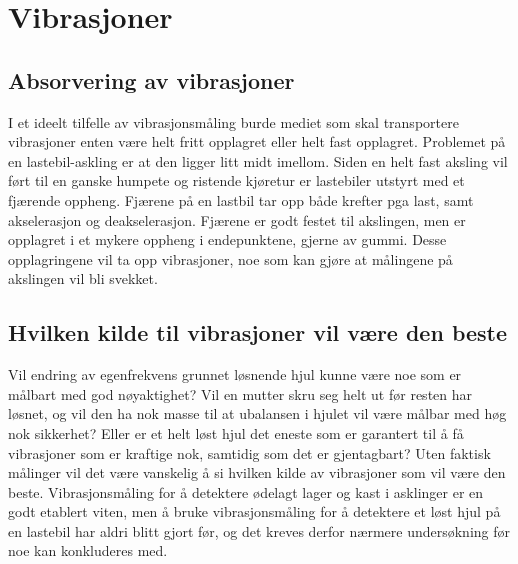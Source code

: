 \section{Vibrasjoner}
\subsection{Absorvering av vibrasjoner}
I et ideelt tilfelle av vibrasjonsmåling burde mediet som skal transportere vibrasjoner 
enten være helt fritt opplagret eller helt fast opplagret. Problemet på en lastebil-askling 
er at den ligger litt midt imellom. Siden en helt fast aksling vil ført til en ganske humpete 
og ristende kjøretur er lastebiler utstyrt med et fjærende oppheng. Fjærene på en lastbil
 tar opp både krefter pga last, samt akselerasjon og deakselerasjon. Fjærene er godt 
festet til akslingen, men er opplagret i et mykere oppheng i endepunktene, gjerne av gummi. 
Desse opplagringene vil ta opp vibrasjoner, noe som kan gjøre at målingene på akslingen vil bli svekket.

\subsection{Hvilken kilde til vibrasjoner vil være den beste}
Vil endring av egenfrekvens grunnet løsnende hjul kunne være noe som er 
målbart med god nøyaktighet? Vil en mutter skru seg helt ut før resten har
 løsnet, og vil den ha nok masse til at ubalansen i hjulet vil være målbar med 
høg nok sikkerhet? Eller er et helt løst hjul det eneste som er garantert til å få 
vibrasjoner som er kraftige nok, samtidig som det er gjentagbart?
Uten faktisk målinger vil det være vanskelig å si hvilken kilde av vibrasjoner 
som vil være den beste. Vibrasjonsmåling for å detektere ødelagt lager og 
kast i asklinger er en godt etablert viten, men å bruke vibrasjonsmåling for 
å detektere et løst hjul på en lastebil har aldri blitt gjort før, og det kreves 
derfor nærmere undersøkning før noe kan konkluderes med. 
